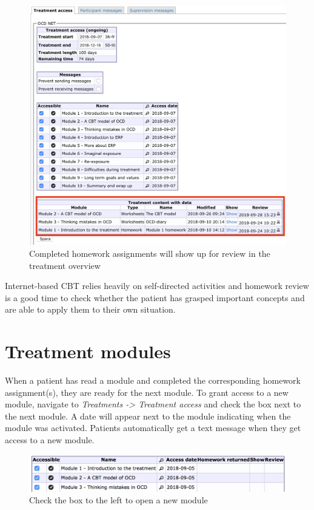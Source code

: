 \documentclass[]{book}
\theoremstyle{definition}
\theoremstyle{definition}
\theoremstyle{definition}
\theoremstyle{remark}
\begin{document}
\begin{figure}
\centering
\includegraphics{images/homework-complete.png}
\caption{Completed homework assignments will show up for review in the
treatment overview}
\end{figure}

Internet-based CBT relies heavily on self-directed activities and
homework review is a good time to check whether the patient has grasped
important concepts and are able to apply them to their own situation.

\hypertarget{treatment-modules}{%
\section{Treatment modules}\label{treatment-modules}}

When a patient has read a module and completed the corresponding
homework assignment(s), they are ready for the next module. To grant
access to a new module, navigate to \emph{Treatments -\textgreater{}
Treatment access} and check the box next to the next module. A date will
appear next to the module indicating when the module was activated.
Patients automatically get a text message when they get access to a new
module.

\begin{figure}
\centering
\includegraphics{images/module-access.png}
\caption{Check the box to the left to open a new module}
\end{figure}
\end{document}
